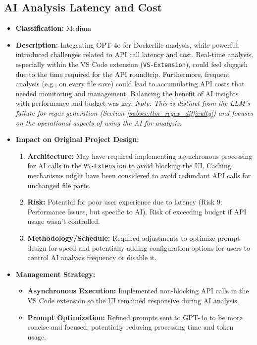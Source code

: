 \subsection{AI Analysis Latency and Cost}
\label{subsec:ai_latency_cost_difficulty}
\begin{itemize}
    \item \textbf{Classification:} Medium
    \item \textbf{Description:} Integrating GPT-4o for Dockerfile analysis, while powerful, introduced challenges related to API call latency and cost. Real-time analysis, especially within the VS Code extension (\texttt{VS-Extension}), could feel sluggish due to the time required for the API roundtrip. Furthermore, frequent analysis (e.g., on every file save) could lead to accumulating API costs that needed monitoring and management. Balancing the benefit of AI insights with performance and budget was key. \textit{Note: This is distinct from the LLM's failure for regex generation (Section \ref{subsec:llm_regex_difficulty}) and focuses on the operational aspects of using the AI for analysis.}
    \item \textbf{Impact on Original Project Design:}
        \begin{enumerate}
            \item \textbf{Architecture:} May have required implementing asynchronous processing for AI calls in the \texttt{VS-Extension} to avoid blocking the UI. Caching mechanisms might have been considered to avoid redundant API calls for unchanged file parts.
            \item \textbf{Risk:} Potential for poor user experience due to latency (Risk 9: Performance Issues, but specific to AI). Risk of exceeding budget if API usage wasn't controlled.
            \item \textbf{Methodology/Schedule:} Required adjustments to optimize prompt design for speed and potentially adding configuration options for users to control AI analysis frequency or disable it.
        \end{enumerate}
    \item \textbf{Management Strategy:}
        \begin{itemize}
            \item \textbf{Asynchronous Execution:} Implemented non-blocking API calls in the VS Code extension so the UI remained responsive during AI analysis.
            \item \textbf{Prompt Optimization:} Refined prompts sent to GPT-4o to be more concise and focused, potentially reducing processing time and token usage.
        \end{itemize}
\end{itemize}

